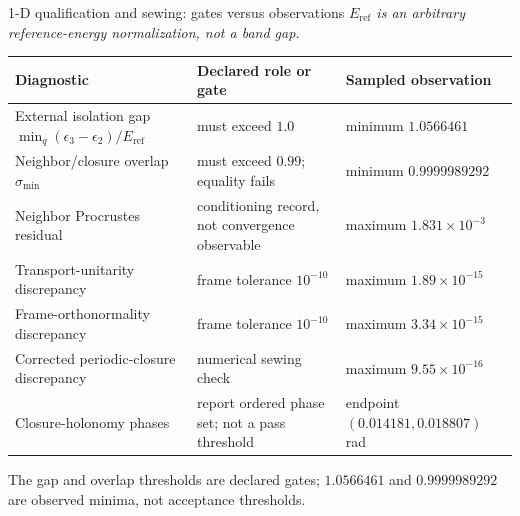 \documentclass[aspectratio=169,10pt]{beamer}
\begin{document}
\begin{frame}{1-D qualification and sewing: gates versus observations}
  \footnotesize
  \textit{$E_{\mathrm{ref}}$ is an arbitrary reference-energy normalization, not a band gap.}
  \vspace{-0.4em}

  \begin{tabular}{p{}p{}p{}}
    \toprule
    Diagnostic & Declared role or gate & Sampled observation\\
    \midrule
    External isolation gap $\min_q(\epsilon_3-\epsilon_2)/E_{\mathrm{ref}}$
      & must exceed $1.0$
      & minimum $1.0566461$\\[0.25em]
    Neighbor/closure overlap $\sigma_{\min}$
      & must exceed $0.99$; equality fails
      & minimum $0.9999989292$\\[0.25em]
    Neighbor Procrustes residual
      & conditioning record, not convergence observable
      & maximum $1.831\times10^{-3}$\\[0.25em]
    Transport-unitarity discrepancy
      & frame tolerance $10^{-10}$
      & maximum $1.89\times10^{-15}$\\[0.25em]
    Frame-orthonormality discrepancy
      & frame tolerance $10^{-10}$
      & maximum $3.34\times10^{-15}$\\[0.25em]
    Corrected periodic-closure discrepancy
      & numerical sewing check
      & maximum $9.55\times10^{-16}$\\[0.25em]
    Closure-holonomy phases
      & report ordered phase set; not a pass threshold
      & endpoint $(0.014181,0.018807)$ rad\\
    \bottomrule
  \end{tabular}

  \vspace{0.6em}
  \centering
  The gap and overlap thresholds are declared gates; $1.0566461$ and $0.9999989292$ are
  observed minima, not acceptance thresholds.
\end{frame}
\end{document}
